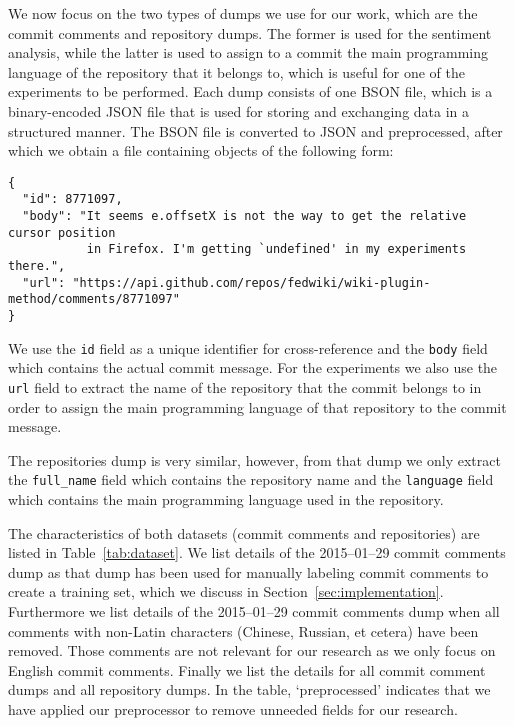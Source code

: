 \documentclass{article}
\begin{document}
We now focus on the two types of dumps we use for our work, which are the
commit comments and repository dumps. The former is used for the sentiment
analysis, while the latter is used to assign to a commit the main programming
language of the repository that it belongs to, which is useful for one of
the experiments to be performed. Each dump consists of one BSON file, which
is a binary-encoded JSON file that is used for storing and exchanging data
in a structured manner. The BSON file is converted to JSON and preprocessed,
after which we obtain a file containing objects of the following form:

\begin{verbatim}
{
  "id": 8771097,
  "body": "It seems e.offsetX is not the way to get the relative cursor position
           in Firefox. I'm getting `undefined' in my experiments there.",
  "url": "https://api.github.com/repos/fedwiki/wiki-plugin-method/comments/8771097"
}
\end{verbatim}

We use the {\tt id} field as a unique identifier for cross-reference and
the {\tt body} field which contains the actual commit message. For the
experiments we also use the {\tt url} field to extract the name of the
repository that the commit belongs to in order to assign the main
programming language of that repository to the commit message.

The repositories dump is very similar, however, from that dump we only
extract the {\tt full\_name} field which contains the repository name and
the {\tt language} field which contains the main programming language used
in the repository.

The characteristics of both datasets (commit comments and repositories) are
listed in Table~\ref{tab:dataset}. We list details of the 2015--01--29
commit comments dump as that dump has been used for manually labeling commit
comments to create a training set, which we discuss in
Section~\ref{sec:implementation}. Furthermore we list details of the
2015--01--29 commit comments dump when all comments with non-Latin characters
(Chinese, Russian, et cetera) have been removed. Those comments are not
relevant for our research as we only focus on English commit comments. Finally
we list the details for all commit comment dumps and all repository dumps. In
the table, `preprocessed' indicates that we have applied our preprocessor to
remove unneeded fields for our research.
\end{document}
